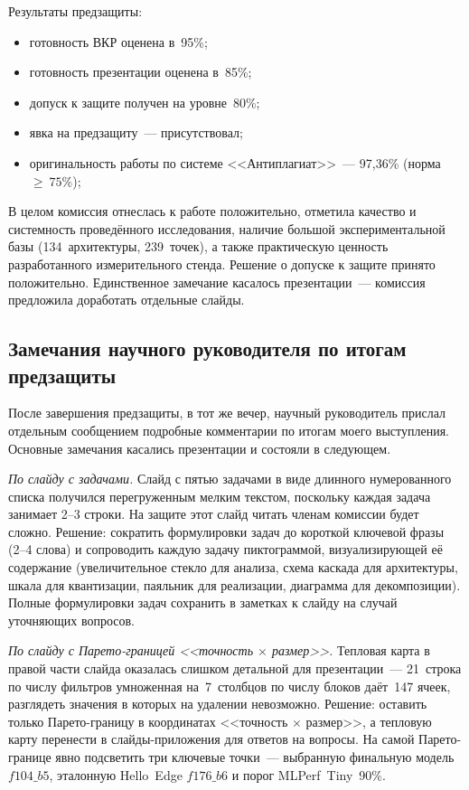 Результаты предзащиты:
\begin{itemize}
	\item готовность ВКР оценена в~95\%;
	\item готовность презентации оценена в~85\%;
	\item допуск к защите получен на уровне~80\%;
	\item явка на предзащиту~--- присутствовал;
	\item оригинальность работы по системе <<Антиплагиат>>~---
	      97,36\% (норма~$\geq~75\%$);
\end{itemize}

В целом комиссия отнеслась к работе положительно, отметила
качество и системность проведённого исследования, наличие
большой экспериментальной базы (134~архитектуры, 239~точек),
а также практическую ценность разработанного измерительного
стенда. Решение о допуске к защите принято положительно.
Единственное замечание касалось презентации~--- комиссия
предложила доработать отдельные слайды.

\subsection{Замечания научного руководителя по итогам предзащиты}

После завершения предзащиты, в тот же вечер, научный
руководитель прислал отдельным сообщением подробные
комментарии по итогам моего выступления. Основные замечания
касались презентации и состояли в следующем.

\textit{По слайду с задачами.} Слайд с пятью задачами в виде
длинного нумерованного списка получился перегруженным мелким
текстом, поскольку каждая задача занимает 2--3 строки. На
защите этот слайд читать членам комиссии будет сложно. Решение:
сократить формулировки задач до короткой ключевой фразы
(2--4 слова) и сопроводить каждую задачу пиктограммой,
визуализирующей её содержание (увеличительное стекло для
анализа, схема каскада для архитектуры, шкала для
квантизации, паяльник для реализации, диаграмма для
декомпозиции). Полные формулировки задач сохранить в
заметках к слайду на случай уточняющих вопросов.

\textit{По слайду с Парето-границей <<точность $\times$
	размер>>.} Тепловая карта в правой части слайда оказалась
слишком детальной для презентации~--- 21~строка по числу
фильтров умноженная на~7~столбцов по числу блоков даёт~147
ячеек, разглядеть значения в которых на удалении невозможно.
Решение: оставить только Парето-границу в координатах
<<точность $\times$ размер>>, а тепловую карту перенести в
слайды-приложения для ответов на вопросы. На самой
Парето-границе явно подсветить три ключевые точки~---
выбранную финальную модель $f104\_b5$, эталонную Hello~Edge
$f176\_b6$ и порог MLPerf~Tiny~90\%.


